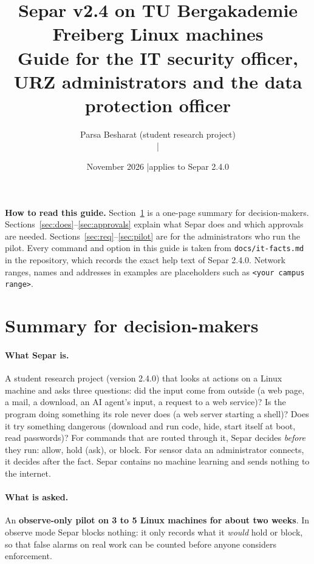 \documentclass[11pt,a4paper]{article}
\title{\Large\bfseries Separ v2.4 on TU Bergakademie Freiberg Linux machines\\[4pt]
\large Guide for the IT security officer, URZ administrators and the data protection officer}
\author{Parsa Besharat (student research project)\\ \contact \quad|\quad \repo}
\date{November 2026 \quad|\quad applies to Separ 2.4.0}
\begin{document}
\maketitle

\begin{callout}
\textbf{How to read this guide.} Section~\ref{sec:summary} is a one-page summary for
decision-makers. Sections~\ref{sec:does}--\ref{sec:approvals} explain what Separ does and which
approvals are needed. Sections~\ref{sec:req}--\ref{sec:pilot} are for the administrators who run
the pilot. Every command and option in this guide is taken from \texttt{docs/it-facts.md} in the
repository, which records the exact help text of Separ 2.4.0. Network ranges, names and addresses
in examples are placeholders such as \texttt{<your campus range>}.
\end{callout}

\tableofcontents
\newpage

\section{Summary for decision-makers}
\label{sec:summary}

\paragraph{What Separ is.} A student research project (version 2.4.0) that looks at actions on a
Linux machine and asks three questions: did the input come from outside (a web page, a mail, a
download, an AI agent's input, a request to a web service)? Is the program doing something its
role never does (a web server starting a shell)? Does it try something dangerous (download and run
code, hide, start itself at boot, read passwords)? For commands that are routed through it, Separ
decides \emph{before} they run: allow, hold (ask), or block. For sensor data an administrator
connects, it decides after the fact. Separ contains no machine learning and sends nothing to the
internet.

\paragraph{What is asked.} An \textbf{observe-only pilot on 3 to 5 Linux machines for about two
weeks}. In observe mode Separ blocks nothing: it only records what it \emph{would} hold or block,
so that false alarms on real work can be counted before anyone considers enforcement.
\end{document}
